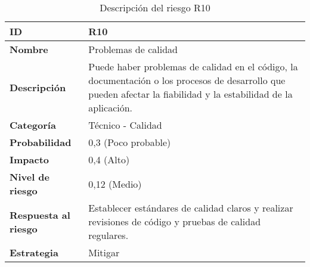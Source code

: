 \begin{table}[H]
	\centering
	\begin{tabular}{|l|m{12cm}|}
		\hline
		\textbf{ID}                  & R10                                                                                                                                                              \\
		\hline
		\textbf{Nombre}              & Problemas de calidad                                                                                                                                             \\
		\hline
		\textbf{Descripción}         & Puede haber problemas de calidad en el código, la documentación o los procesos de desarrollo que pueden afectar la fiabilidad y la estabilidad de la aplicación. \\
		\hline
		\textbf{Categoría}           & Técnico - Calidad                                                                                                                                                \\
		\hline
		\textbf{Probabilidad}        & 0,3 (Poco probable)                                                                                                                                              \\
		\hline
		\textbf{Impacto}             & 0,4 (Alto)                                                                                                                                                       \\
		\hline
		\textbf{Nivel de riesgo}     & 0,12 (Medio)                                                                                                                                                     \\
		\hline
		\textbf{Respuesta al riesgo} & Establecer estándares de calidad claros y realizar revisiones de código y pruebas de calidad regulares.                                                          \\
		\hline
		\textbf{Estrategia}          & Mitigar                                                                                                                                                          \\
		\hline
	\end{tabular}
	\caption{Descripción del riesgo R10}
\end{table}
